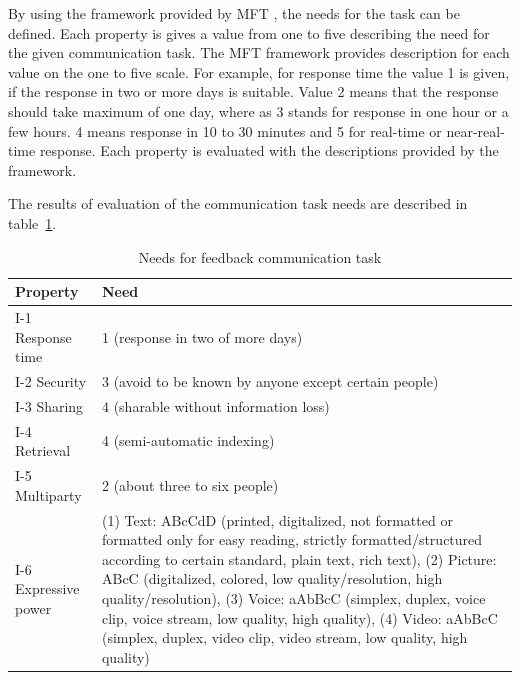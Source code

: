 \documentclass[english,12pt,a4paper,pdftex]{article}
\begin{document}
By using the framework provided by \ac{MFT} \citep{higa2007}, the needs for the task can be defined. Each property is gives a value from one to five describing the need for the given communication task. The \ac{MFT} framework provides description for each value on the one to five scale. For example, for response time the value 1 is given, if the response in two or more days is suitable. Value 2 means that the response should take maximum of one day, where as 3 stands for response in one hour or a few hours. 4 means response in 10 to 30 minutes and 5 for real-time or near-real-time response. Each property is evaluated with the descriptions provided by the framework. 

The results of evaluation of the communication task needs are described in table~\ref{table:needs_for_feedback_communication_task}.

\begin{table}[!h]
\renewcommand{\arraystretch}{1.3}
\caption{Needs for feedback communication task}
\label{table:needs_for_feedback_communication_task}
\centering
\begin{tabular}{|p{7cm}|p{7cm}|}
\hline
\textbf{Property} & \textbf{Need}\\
\hline
I-1 Response time & 1 (response in two of more days) \\
\hline
I-2 Security & 3 (avoid to be known by anyone except certain people) \\
\hline
I-3 Sharing & 4 (sharable without information loss) \\
\hline
I-4 Retrieval & 4 (semi-automatic indexing) \\
\hline
I-5 Multiparty & 2 (about three to six people) \\
\hline
I-6 Expressive power & (1) Text: ABcCdD (printed, digitalized, not formatted or formatted only for easy reading, strictly formatted/structured according to certain standard, plain text, rich text), (2) Picture: ABcC (digitalized, colored, low quality/resolution, high quality/resolution), (3) Voice: aAbBcC (simplex, duplex, voice clip, voice stream, low quality, high quality), (4) Video: aAbBcC (simplex, duplex, video clip, video stream, low quality, high quality) \\
\hline
\end{tabular}
\end{table}
\end{document}
